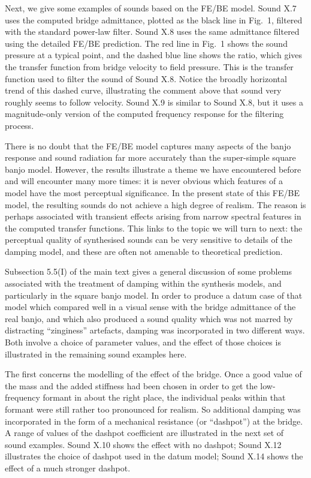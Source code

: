   Next, we give some examples of sounds based on the FE/BE model. Sound X.7 
  uses the computed bridge admittance, plotted as the black line in Fig.\ 1, 
  filtered with the standard power-law filter. Sound X.8 uses the same 
  admittance filtered using the detailed FE/BE prediction. The red line in 
  Fig.\ 1 shows the sound pressure at a typical point, and the dashed blue line 
  shows the ratio, which gives the transfer function from bridge velocity to 
  field pressure. This is the transfer function used to filter the sound of 
  Sound X.8. Notice the broadly horizontal trend of this dashed curve, 
  illustrating the comment above that sound very roughly seems to follow 
  velocity. Sound X.9 is similar to Sound X.8, but it uses a magnitude-only 
  version of the computed frequency response for the filtering process. 

  There is no doubt that the FE/BE model captures many aspects of the banjo 
  response and sound radiation far more accurately than the super-simple square 
  banjo model. However, the results illustrate a theme we have encountered 
  before and will encounter many more times: it is never obvious which features 
  of a model have the most perceptual significance. In the present state of 
  this FE/BE model, the resulting sounds do not achieve a high degree of 
  realism. The reason is perhaps associated with transient effects arising from 
  narrow spectral features in the computed transfer functions. This links to 
  the topic we will turn to next: the perceptual quality of synthesised sounds 
  can be very sensitive to details of the damping model, and these are often 
  not amenable to theoretical prediction. 

  Subsection 5.5(I) of the main text gives a general discussion of some 
  problems associated with the treatment of damping within the synthesis 
  models, and particularly in the square banjo model. In order to produce a 
  datum case of that model which compared well in a visual sense with the 
  bridge admittance of the real banjo, and which also produced a sound quality 
  which was not marred by distracting ``zinginess'' artefacts, damping was 
  incorporated in two different ways. Both involve a choice of parameter 
  values, and the effect of those choices is illustrated in the remaining sound 
  examples here. 

  The first concerns the modelling of the effect of the bridge. Once a good 
  value of the mass and the added stiffness had been chosen in order to get the 
  low-frequency formant in about the right place, the individual peaks within 
  that formant were still rather too pronounced for realism. So additional 
  damping was incorporated in the form of a mechanical resistance (or 
  ``dashpot'') at the bridge. A range of values of the dashpot coefficient are 
  illustrated in the next set of sound examples. Sound X.10 shows the effect 
  with no dashpot; Sound X.12 illustrates the choice of dashpot used in the 
  datum model; Sound X.14 shows the effect of a much stronger dashpot. 

